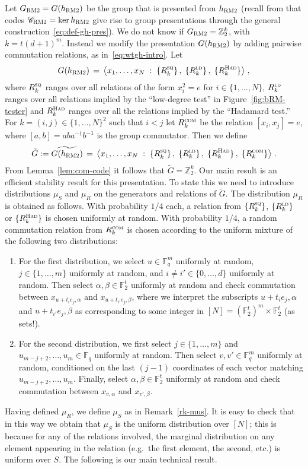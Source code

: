 \documentclass[11pt]{article}
\theoremstyle{definition}
\newcommand{\code}{\mathscr{C}}
\newcommand{\F}{\ensuremath{\mathbb{F}}}
\newcommand{\ld}{\textsc{ld}}
\newcommand{\com}{\textsc{com}}
\newcommand{\sq}{\textsc{sq}}
\newcommand{\Z}{\ensuremath{\mathbb{Z}}}
\newcommand{\bRM}{\ensuremath{\textsc{RM2}}}
\newcommand{\had}{\textsc{Had}}
\begin{document}
Let $G_\bRM = G(h_\bRM)$ be the group that is presented from $h_\bRM$ (recall from  that codes $\code_\bRM=\ker h_\bRM$ give rise to group presentations through the general construction~\eqref{eq:def-gh-pres}). We do not know if $G_\bRM = \Z_2^k$, with $k=t(d+1)^m$. Instead we modify the presentation $G(h_\bRM)$ by adding pairwise commutation relations, as in~\eqref{eq:wtgh-intro}. Let 
\[ G(h_\bRM) \,=\, \big\langle x_1,\ldots,x_N \;:\; \{R^\sq_k\}\,,\; \{R^\ld_k\}\,,\; \{R^\had_{k}\} \big\rangle\;,\]
where  $R^\sq_k$ ranges over all relations of the form $x_i^2=e$ for $i\in \{1,\ldots,N\}$, $R^\ld_k$ ranges over all relations implied by the ``low-degree test'' in Figure~\ref{fig:bRM-tester} and $R^\had_{k}$ ranges over all the relations implied by the ``Hadamard test.'' For $k=(i,j)\in\{1,\ldots,N\}^2$ such that $i<j$ let $R^\com_k$ be the relation $[x_i,x_j]=e$, where $[a,b]=aba^{-1}b^{-1}$ is the group commutator.
Then we define
\begin{equation}\label{eq:z2k-eff}
\tilde{G}:=\widetilde{G(h_\bRM) } \,=\,\big\langle x_1,\ldots,x_N \;:\; \{R^\sq_k\}\,,\; \{R^\ld_k\}\,,\; \{R^\had_{k}\}\, , \; \{ R^\com_k\}\big\rangle\;.
\end{equation}
From Lemma~\ref{lem:com-code} it follows that $\tilde{G}=\Z_2^k$. Our main result is an efficient stability result for this presentation. To state this we need to introduce distributions $\mu_S$ and $\mu_R$ on the generators and relations of $\tilde{G}$. The distribution $\mu_R$ is obtained as follows. With probability $1/4$ each, a relation from $\{R^\sq_k\}$, $\{R^\ld_k\}$ or $\{R^\had_k\}$ is chosen uniformly at random. With probability $1/4$, a random commutation relation from $R^\com_k$ is chosen according to the uniform mixture of the following two distributions:
\begin{enumerate}
\item For the first distribution, we select $u\in \F_q^m$ uniformly at random, $j\in\{1,\ldots,m\}$ uniformly at random, and $i\neq i'\in\{0,\ldots,d\}$ uniformly at random. Then select $\alpha,\beta\in \F_2^t$ uniformly at random and check commutation between $x_{u+t_i e_j,\alpha}$ and $x_{u+t_{i'} e_j,\beta}$, where we interpret the subscripts  $u+t_i e_j,\alpha$ and $u+t_{i'} e_j,\beta$ as corresponding to some integer in $[N]= (\F_2^t)^m \times \F_2^t$ (as sets!). 

\item For the second distribution, we first select $j\in\{1,\ldots,m\}$ and $u_{m-j+2},\ldots,u_m \in \F_q$ uniformly at random. Then select $v,v' \in \F_q^m$ uniformly at random, conditioned on the last $(j-1)$ coordinates of each vector matching $u_{m-j+2},\ldots,u_m$. Finally, select $\alpha,\beta\in \F_2^t$ uniformly at random and check commutation between $x_{v,\alpha}$ and $x_{v',\beta}$. 
\end{enumerate}
Having defined $\mu_R$, we define $\mu_S$ as in Remark~\ref{rk-mus}. It is easy to check that in this way we obtain that $\mu_S$ is the uniform distribution over $[N] $; this is because for any of the relations involved, the marginal distribution on any element appearing in the relation (e.g.\ the first element, the second, etc.) is uniform over $S$. The following is our main technical result. 
\end{document}
